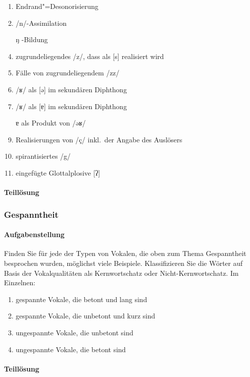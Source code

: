 \begin{enumerate}
  \item Endrand"=Desonorisierung
  \item /n/-Assimilation
  \item [ŋ]-Bildung
  \item zugrundeliegendes /z/, dass als [s] realisiert wird
  \item Fälle von zugrundeliegendem /zz/
  \item /ʁ/ als [ə] im sekundären Diphthong
  \item /ʁ/ als [ɐ] im sekundären Diphthong
  \item [ɐ] als Produkt von /əʁ/
  \item Realisierungen von /ç/ inkl.\ der Angabe des Auslösers
  \item spirantisiertes /g/
  \item eingefügte Glottalplosive [ʔ]
\end{enumerate}

\paragraph*{Teillösung}


\subsubsection{Gespanntheit}

\paragraph*{Aufgabenstellung}

Finden Sie für jede der Typen von Vokalen, die oben zum Thema Gespanntheit besprochen wurden, möglichst viele Beispiele.
Klassifizieren Sie die Wörter auf Basis der Vokalqualitäten als Kernwortschatz oder Nicht-Kernwortschatz.
Im Einzelnen:

\begin{enumerate}
  \item gespannte Vokale, die betont und lang sind
  \item gespannte Vokale, die unbetont und kurz sind
  \item ungespannte Vokale, die unbetont sind
  \item ungespannte Vokale, die betont sind
\end{enumerate}

\paragraph*{Teillösung}



